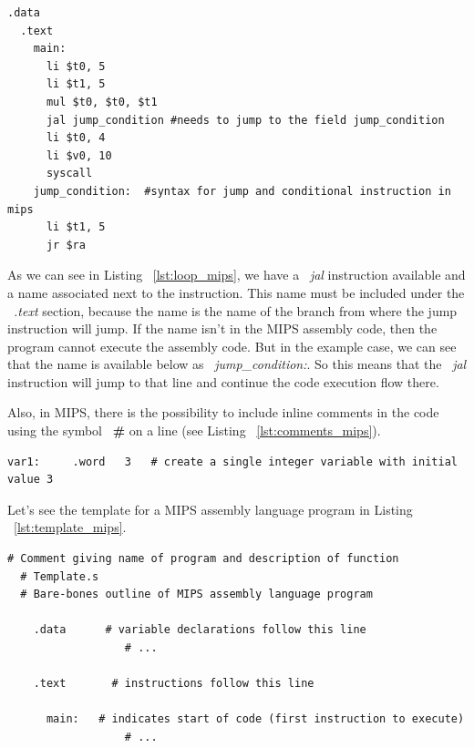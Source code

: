 \documentclass[
  oneside,
  11pt, a4paper,
  footinclude=true,
  headinclude=true,
  cleardoublepage=empty
]{scrbook}
\begin{document}
\begin{lstlisting}[caption={Example of a loop declaration in MIPS},label={lst:loop_mips}]
  .data 
  .text 
    main:
      li $t0, 5
      li $t1, 5
      mul $t0, $t0, $t1
      jal jump_condition #needs to jump to the field jump_condition
      li $t0, 4
      li $v0, 10
      syscall 
    jump_condition:  #syntax for jump and conditional instruction in mips
      li $t1, 5
      jr $ra
\end{lstlisting}

As we can see in Listing ~\ref{lst:loop_mips}, we have a ~\textit{jal} instruction available and a name associated next to the instruction. This name must be included under the ~\textit{.text} section, because the name is the name of the branch from where the jump instruction will jump. If the name isn't in the MIPS assembly code, then the program cannot execute the assembly code.
But in the example case, we can see that the name is available below as ~\textit{jump\_condition:}.
So this means that the ~\textit{jal} instruction will jump to that line and continue the code execution flow there.


Also, in MIPS, there is the possibility to include inline comments in the code using the symbol ~\textbf{\#}  on a line (see Listing ~\ref{lst:comments_mips}).

\begin{lstlisting}[caption={Example of a comment in MIPS},label={lst:comments_mips}]
  var1:		.word	3	# create a single integer variable with initial value 3
\end{lstlisting}

Let's see the template for a MIPS assembly language program in Listing ~\ref{lst:template_mips}.

\begin{lstlisting}[caption={Template of a MIPS assembly language},label={lst:template_mips}]
  # Comment giving name of program and description of function
  # Template.s
  # Bare-bones outline of MIPS assembly language program

    .data      # variable declarations follow this line
                  # ...
														
    .text       # instructions follow this line	
																	
      main:   # indicates start of code (first instruction to execute)
                  # ...
\end{lstlisting}
\end{document}
